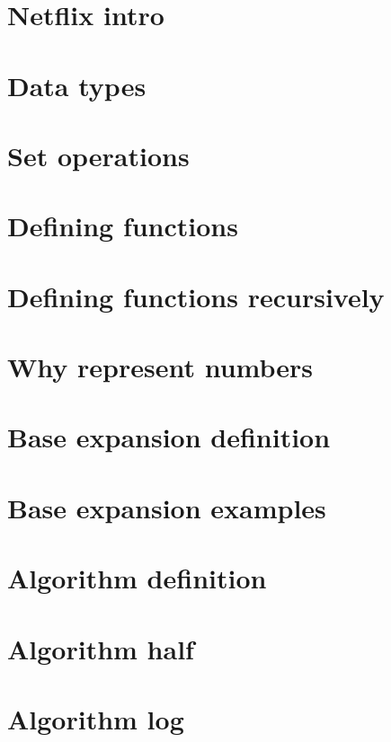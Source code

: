 \section*{Netflix intro}

\vfill
\section*{Data types}

\vfill
\section*{Set operations}

\vfill
\section*{Defining functions}

\vfill
\section*{Defining functions recursively}

\vfill
\section*{Why represent numbers}

\vfill
\section*{Base expansion definition}

\vfill
\section*{Base expansion examples}

\vfill
\section*{Algorithm definition}

\vfill
\section*{Algorithm half}

\vfill
\section*{Algorithm log}

\vfill
